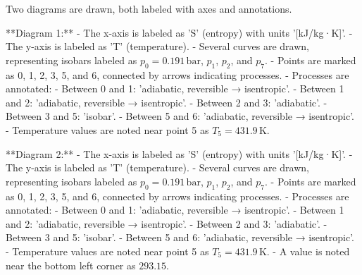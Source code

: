 Two diagrams are drawn, both labeled with axes and annotations.  

**Diagram 1:**  
- The x-axis is labeled as 'S' (entropy) with units '[kJ/kg·K]'.  
- The y-axis is labeled as 'T' (temperature).  
- Several curves are drawn, representing isobars labeled as \( p_0 = 0.191 \, \text{bar} \), \( p_1 \), \( p_2 \), and \( p_7 \).  
- Points are marked as 0, 1, 2, 3, 5, and 6, connected by arrows indicating processes.  
- Processes are annotated:  
  - Between 0 and 1: 'adiabatic, reversible → isentropic'.  
  - Between 1 and 2: 'adiabatic, reversible → isentropic'.  
  - Between 2 and 3: 'adiabatic'.  
  - Between 3 and 5: 'isobar'.  
  - Between 5 and 6: 'adiabatic, reversible → isentropic'.  
- Temperature values are noted near point 5 as \( T_5 = 431.9 \, \text{K} \).  

**Diagram 2:**  
- The x-axis is labeled as 'S' (entropy) with units '[kJ/kg·K]'.  
- The y-axis is labeled as 'T' (temperature).  
- Several curves are drawn, representing isobars labeled as \( p_0 = 0.191 \, \text{bar} \), \( p_1 \), \( p_2 \), and \( p_7 \).  
- Points are marked as 0, 1, 2, 3, 5, and 6, connected by arrows indicating processes.  
- Processes are annotated:  
  - Between 0 and 1: 'adiabatic, reversible → isentropic'.  
  - Between 1 and 2: 'adiabatic, reversible → isentropic'.  
  - Between 2 and 3: 'adiabatic'.  
  - Between 3 and 5: 'isobar'.  
  - Between 5 and 6: 'adiabatic, reversible → isentropic'.  
- Temperature values are noted near point 5 as \( T_5 = 431.9 \, \text{K} \).  
- A value is noted near the bottom left corner as \( 293.15 \).